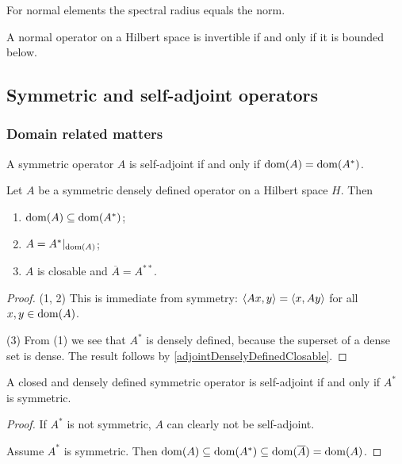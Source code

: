 \begin{lemma} \label{normalSpectralRadiusEqualsNorm}
For normal elements the spectral radius equals the norm.
\end{lemma}

\begin{lemma}
A normal operator on a Hilbert space is invertible \textup{if and only if} it is bounded below.
\end{lemma}

\subsection{Symmetric and self-adjoint operators}
\subsubsection{Domain related matters}
A symmetric operator $A$ is self-adjoint if and only if $\operatorname{dom}(A) = \operatorname{dom}(A^*)$.
\begin{lemma} \label{symmetricOperatorAdjointInclusion}
Let $A$ be a symmetric densely defined operator on a Hilbert space $H$. Then
\begin{enumerate}
\item $\operatorname{dom}(A) \subseteq \operatorname{dom}(A^*)$;
\item $A = A^*|_{\operatorname{dom}(A)}$;
\item $A$ is closable and $\overline{A} = A^{**}$.
\end{enumerate}
\end{lemma}
\begin{proof}
(1, 2) This is immediate from symmetry: $\left\langle Ax,y \right\rangle = \left\langle x,Ay \right\rangle$ for all $x,y\in\operatorname{dom}(A)$.

(3) From (1) we see that $A^*$ is densely defined, because the superset of a dense set is dense. The result follows by \ref{adjointDenselyDefinedClosable}.
\end{proof}
\begin{corollary}
A closed and densely defined symmetric operator is self-adjoint \textup{if and only if} $A^*$ is symmetric.
\end{corollary}
\begin{proof}
If $A^*$ is not symmetric, $A$ can clearly not be self-adjoint.

Assume $A^*$ is symmetric. Then $\operatorname{dom}(A) \subseteq \operatorname{dom}(A^*) \subseteq \operatorname{dom}(\overline{A}) = \operatorname{dom}(A)$.
\end{proof}

